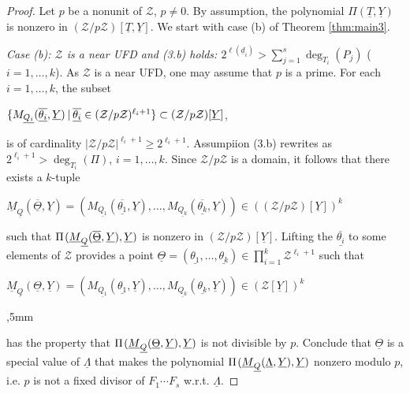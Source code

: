 \documentclass[11pt,a4paper,reqno]{amsart}
\theoremstyle{definition}
\begin{document}
\begin{proof} Let $p$ be a nonunit of ${\mathcal Z}$, $p\not=0$. By assumption, the polynomial $\Pi(\underline T,\underline Y)$ is nonzero in $({\mathcal Z}/p{\mathcal Z})[\underline T,\underline Y]$. We start with case (b) of Theorem \ref{thm:main3}.
\vskip 1mm

\noindent
\emph{Case {\rm (b)}: ${\mathcal Z}$ is a near UFD and {\rm (3.b)} holds: $2^{\ell({\underline d}_i)} > \sum_{j=1}^s \deg_{T_i}(P_j)$} ($i=1,\ldots,k$). As ${\mathcal Z}$ is a near UFD, one may assume that $p$ is a prime. For each $i=1,\ldots,k$, the subset
\vskip 2mm

\centerline{$\{M_{\underline {Q_i}}({\overline{\underline{\theta_i}}}, \underline Y) \hskip 2pt | \hskip 2pt \overline{\underline{\theta_i}} \in ({\mathcal Z}/p{\mathcal Z})^{\ell_i+1}\} \subset ({\mathcal Z}/p{\mathcal Z})[\underline Y]$,}
\vskip 2mm

\noindent
is of cardinality $|{\mathcal Z}/p{\mathcal Z}|^{\ell_i+1} \geq 2^{\ell_i+1}$. 
Assumpiion (3.b) rewrites as $2^{\ell_i+1}> \deg_{T_i}(\Pi)$, $i=1,\ldots,k$. Since ${\mathcal Z}/p{\mathcal Z}$ is a domain, it follows that there exists a $k$-tuple 
\vskip 1mm

\centerline{$\underline M_{\underline Q}( \overline{\underline{\Theta}},\underline Y)=(M_{\underline {Q_1}}({\overline{\underline{\theta_1}}}, \underline Y), \ldots, M_{\underline {Q_k}}({\overline{\underline{\theta_k}}}, \underline Y)) \in (({\mathcal Z}/p{\mathcal Z})[\underline Y])^k$}
\vskip 1mm

\noindent
such that
$\Pi\hskip 1pt (\underline M_{\underline Q}(\overline{\underline{\Theta}},\underline Y),\underline Y)$ is nonzero in $({\mathcal Z}/p{\mathcal Z})[\underline Y]$.
 Lifting the $\overline{\underline{\theta_i}}$ to some elements of ${\mathcal Z}$ provides a point ${\underline{\Theta}} = (\underline {\theta_1},\ldots,\underline{\theta_k})\in \prod_{i=1}^k {\mathcal Z}^{\ell_i+1}$ such that 
 \vskip 1mm
 
 \centerline{$\underline M_{\underline Q}( \underline{\Theta},\underline Y)=(M_{\underline {Q_1}}({\underline{\theta_1}}, \underline Y), \ldots, M_{\underline {Q_k}}(\underline{\theta_k}, \underline Y)) \in ({\mathcal Z}[\underline Y])^k$}
 
 ,5mm

 \noindent
  has the property that $\Pi\hskip 1pt (\underline M_{\underline Q}(\underline{\Theta},\underline Y),\underline Y)$ is not divisible by $p$.  
Conclude that $\underline{\Theta}$ is a special value of $\underline{\Lambda}$ that makes the polynomial $\Pi\hskip 1pt (\underline M_{\underline Q}(\underline{\Lambda},\underline Y),\underline Y)$ nonzero modulo $p$, \hbox{i.e.} $p$ is not a fixed divisor of $F_1\cdots F_s$ \hbox{w.r.t.} $\underline{\Lambda}$.
\vskip 2mm


\end{proof}
\end{document}
